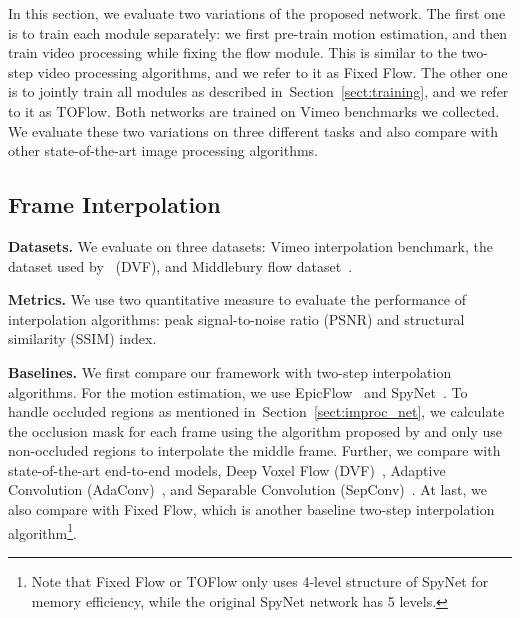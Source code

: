 \documentclass[twocolumn,natbib]{svjour3}          \smartqed  \usepackage{graphicx}
\newcommand{\sect}[1]{Section~\ref{#1}}
\def\model{TOFlow\xspace}
\def\toflow{TOFlow\xspace}
\def\fflow{Fixed Flow\xspace}
\def\epicflow{EpicFlow\xspace}
\def\interpbenchmark{Vimeo interpolation benchmark\xspace}
\def\flownet{motion estimation\xspace}
\def\procnet{video processing\xspace}
\newcommand{\myparagraph}[1]{\vspace{5pt}\noindent\textbf{#1}}
\begin{document}
In this section, we evaluate two variations of the proposed network. The first one is to train each module separately: we first pre-train \flownet, and then train \procnet while fixing the flow module. This is similar to the two-step video processing algorithms, and we refer to it as \fflow. The other one is to jointly train all modules as described in~\sect{sect:training}, and we refer to it as \model. Both networks are trained on Vimeo benchmarks we collected. We evaluate these two variations on three different tasks and also compare with other state-of-the-art image processing algorithms.

\subsection{Frame Interpolation}
\label{sec:exp_interp}

\myparagraph{Datasets.}
We evaluate on three datasets: \interpbenchmark, the dataset used by~\cite{Liu2017Video} (DVF), and Middlebury flow dataset~\citep{baker2011database}.

\myparagraph{Metrics. } We use two quantitative measure to evaluate the performance of interpolation algorithms: peak signal-to-noise ratio (PSNR) and structural similarity (SSIM) index.

\myparagraph{Baselines. }
We first compare our framework with two-step interpolation algorithms.
For the motion estimation, we use \epicflow~\citep{Revaud2015Epicflow} and SpyNet~\citep{Ranjan2017Optical}.
To handle occluded regions as mentioned in~\sect{sect:improc_net}, we calculate the occlusion mask for each frame using the algorithm proposed by \cite{Zitnick2004High} and only use non-occluded regions to interpolate the middle frame.
Further, we compare with state-of-the-art end-to-end models, Deep Voxel Flow (DVF)~\citep{Liu2017Video}, Adaptive Convolution (AdaConv)~\citep{niklaus2017video}, and Separable Convolution (SepConv)~\citep{niklaus2017iccv}. At last, we also compare with \fflow, which is another baseline two-step interpolation algorithm\footnote{Note that \fflow or \toflow only uses 4-level structure of SpyNet for memory efficiency, while the original SpyNet network has 5 levels.}.
\end{document}
